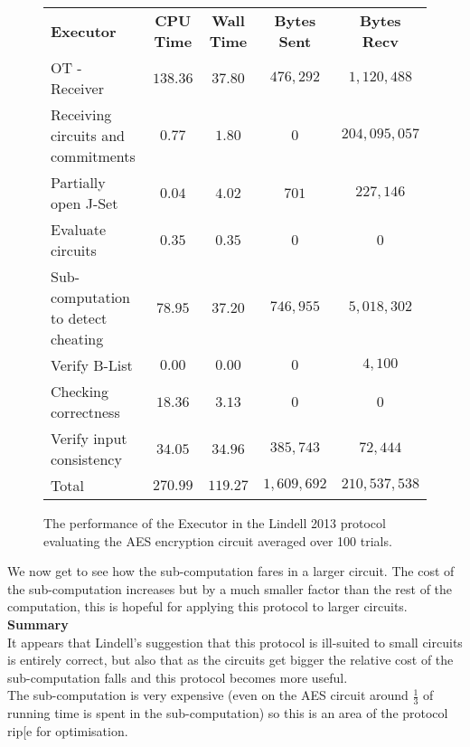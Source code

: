 \documentclass[ %
                    author={Nicholas Tutte},
                supervisor={Prof. Nigel Smart},
                    degree={MEng},
                     title={Secure Two Party Computation},
                  subtitle={A practical comparison of recent protocols},
                      type={Research - GG1K},
                      year={2015} ]{dissertation}
\begin{document}
				\begin{figure}[!ht]
					\begin{tabular}{| p{4.3cm} | c c c c |}
						\hline
						\textbf{Executor} & \textbf{CPU Time} & \textbf{Wall Time} & \textbf{Bytes Sent} & \textbf{Bytes Recv} \\
						\thickhline
						OT - Receiver & $138.36$ & $37.80$ & $476,292$ & $1,120,488$ \\
						\hline
						Receiving circuits and commitments & $0.77$ & $1.80$ & $0$ & $204,095,057$ \\
						\hline
						Partially open J-Set & $0.04$ & $4.02$ & $701$ & $227,146$ \\
						\hline
						Evaluate circuits & $0.35$ & $0.35$ & $0$ & $0$ \\
						\hline
						Sub-computation to detect cheating & $78.95$ & $37.20$ & $746,955$ & $5,018,302$ \\
						\hline
						Verify B-List & $0.00$ & $0.00$ & $0$ & $4,100$ \\
						\hline
						Checking correctness & $18.36$ & $3.13$ & $0$ & $0$ \\
						\hline
						Verify input consistency & $34.05$ & $34.96$ & $385,743$ & $72,444$ \\
						\thickhline
						Total & $270.99$ & $119.27$ & $1,609,692$ & $210,537,538$ \\
						\hline
					\end{tabular}
					\caption{The performance of the Executor in the Lindell 2013 protocol evaluating the AES encryption circuit averaged over 100 trials. \label{table:L_2013_AES_Executor}}
				\end{figure}
				\FloatBarrier

				We now get to see how the sub-computation fares in a larger circuit. The cost of the sub-computation increases but by a much smaller factor than the rest of the computation, this is hopeful for applying this protocol to larger circuits.\\

				\noindent\textbf{Summary}\\

					It appears that Lindell's suggestion that this protocol is ill-suited to small circuits is entirely correct, but also that as the circuits get bigger the relative cost of the sub-computation falls and this protocol becomes more useful.\\

					The sub-computation is very expensive (even on the AES circuit around $\frac{1}{3}$ of running time is spent in the sub-computation) so this is an area of the protocol rip[e for optimisation.\\
\end{document}
